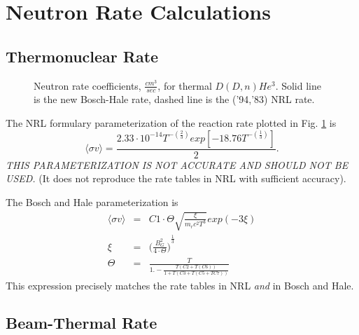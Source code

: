 \section{Neutron Rate Calculations}

\subsection{Thermonuclear Rate}

\begin{figure}[hbt] %
 \centering
 \mbox{}
 \caption{Neutron rate coefficients, $\frac{cm^3}{sec}$, for thermal 
 $D(D,n)He^3 $. Solid line is the new Bosch-Hale rate, dashed line is the
 ('94,'83) NRL rate.}
 \label{Figps2}
\end{figure}

The NRL formulary parameterization of the reaction rate plotted
in Fig. \ref{Figps2} is
\begin{equation}
 \langle\sigma v\rangle =\frac{2.33\cdot 10^{-14}T^{-(\frac{2}{3})}exp[-18.76
 T^{-(\frac{1}{3})}]}{2}.
\end{equation}
\emph{THIS PARAMETERIZATION IS NOT ACCURATE AND SHOULD NOT BE USED.}  (It does
not reproduce the rate tables in NRL with sufficient  accuracy).

The Bosch and Hale parameterization is
\begin{eqnarray}
 \langle\sigma v\rangle &  = &
  C1\cdot\Theta\sqrt{\frac{\xi}{m_rc^2T^3}}exp(-3\xi) \\
 \xi & = & {\biggl(\frac{B_G^2}{4\cdot\Theta}\biggr)}^{\frac{1}{3}}\\
 \Theta & = & \frac{T}{1.-\frac{T(C2+T(C6))}{1+T(C3+T(C5+TC7))}}
\end{eqnarray}
This expression precisely  matches the rate tables in NRL \emph{and} in Bosch
and Hale.

\subsection{Beam-Thermal Rate}

